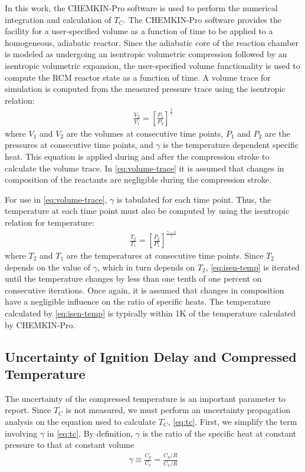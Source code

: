 \documentclass[12pt, letterpaper]{article}
\begin{document}
In this work, the CHEMKIN-Pro \cite{Chemkin2012} software is used to
perform the numerical integration and calculation of $T_C$. The
CHEMKIN-Pro software provides the facility for a user-specified
volume as a function of time to be applied to a homogeneous,
adiabatic reactor. Since the adiabatic core of the reaction chamber
is modeled as undergoing an isentropic volumetric compression followed
by an isentropic volumetric expansion, the user-specified volume
functionality is used to compute the RCM reactor state as a function
of time. A volume trace for simulation is computed from the measured
pressure trace using the isentropic relation:
%
\begin{align}
\frac{V_2}{V_1} = \left[\frac{P_1}{P_2}\right]^{\frac{1}{\gamma}}
\label{eq:volume-trace}
\end{align}
%
where $V_1$ and $V_2$ are the volumes at consecutive time points,
$P_1$ and $P_2$ are the pressures at consecutive time points, and
$\gamma$ is the temperature dependent specific heat. This equation
is applied during and after the compression stroke to calculate
the volume trace. In \autoref{eq:volume-trace} it is assumed that
changes in composition of the reactants are negligible during the
compression stroke.

For use in \autoref{eq:volume-trace}, $\gamma$ is tabulated for each
time point. Thus, the temperature at each time point must also be
computed by using the isentropic relation for temperature:
%
\begin{align}
\frac{T_2}{T_1} = \left[\frac{P_2}{P_1}\right]^{\frac{\gamma-1}{\gamma}}
\label{eq:isen-temp}
\end{align}
%
where $T_2$ and $T_1$ are the temperatures at consecutive time points.
Since $T_2$ depends on the value of $\gamma$, which in turn depends
on $T_2$, \autoref{eq:isen-temp} is iterated until the temperature
changes by less than one tenth of one percent on consecutive iterations.
Once again, it is assumed that changes in composition have a negligible
influence on the ratio of specific heats.
The temperature calculated by \autoref{eq:isen-temp} is typically within
1K of the temperature calculated by CHEMKIN-Pro.

\subsection{Uncertainty of Ignition Delay and Compressed Temperature}
\label{sec:uncertainty}

The uncertainty of the compressed temperature is an important parameter
to report. Since $T_C$ is not measured, we must perform an uncertainty
propagation analysis on the equation used to calculate $T_C$,
\autoref{eq:tc}. First, we simplify the term involving $\gamma$ in
\autoref{eq:tc}. By definition, $\gamma$ is the ratio of the specific heat
at constant pressure to that at constant volume
%
\begin{align}
\gamma \equiv \frac{C_p}{C_v} = \frac{C_p/R}{C_v/R}
\end{align}
\end{document}
